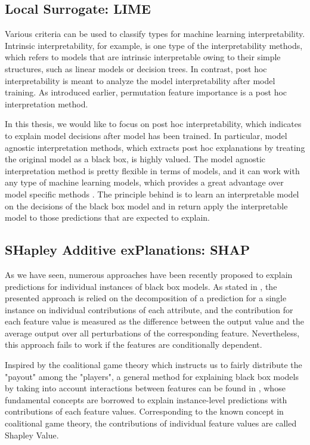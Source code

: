 \subsection{Local Surrogate: LIME}

Various criteria can be used to classify types for machine learning interpretability. Intrinsic interpretability, for example, is one type of the interpretability methods, which refers to models that are intrinsic interpretable owing to their simple structures, such as linear models or decision trees. In contrast, post hoc interpretability is meant to analyze the model interpretability after model training. As introduced earlier, permutation feature importance is a post hoc interpretation method. 
 
In this thesis, we would like to focus on post hoc interpretability, which indicates to explain model decisions after model has been trained. In particular, model agnostic interpretation methods, which extracts post hoc explanations by treating the original model as a black box, is highly valued. The model agnostic interpretation method is pretty flexible in terms of models, and it can work with any type of machine learning models, which provides a great advantage over model specific methods \cite{ribeiro2016model}. The principle behind is to learn an interpretable model on the decisions of the black box model and in return apply the interpretable model to those predictions that are expected to explain.  


\subsection{SHapley Additive exPlanations: SHAP}

As we have seen, numerous approaches have been recently proposed to explain predictions for individual instances of black box models. As stated in \cite{robnik2008explaining}, the presented approach is relied on the decomposition of a prediction for a single instance on individual contributions of each attribute, and the contribution for each feature value is measured as the difference between the output value and the average output over all perturbations of the corresponding feature. Nevertheless, this approach fails to work if the features are conditionally dependent. 

Inspired by the coalitional game theory which instructs us to fairly distribute the "payout" among the "players", a general method for explaining black box models by taking into account interactions between features can be found in \cite{kononenko2010efficient}, whose fundamental concepts are borrowed to explain instance-level predictions with contributions of each feature values. Corresponding to the known concept in coalitional game theory, the contributions of individual feature values are called Shapley Value.

